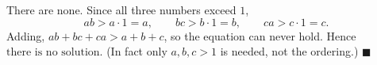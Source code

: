 There are none. Since all three numbers exceed $1$,
\[
ab>a\cdot1=a,\qquad bc>b\cdot1=b,\qquad ca>c\cdot1=c .
\]
Adding, $ab+bc+ca>a+b+c$, so the equation can never hold. Hence $\boxed{\text{there is no solution}}$. (In fact only $a,b,c>1$ is needed, not the ordering.) $\blacksquare$
